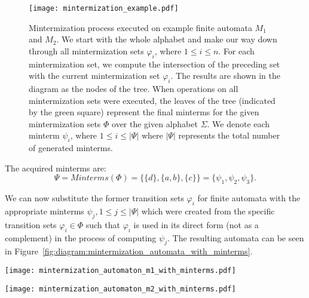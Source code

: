 \begin{figure}[ht]
	\centering
	\texttt{[image: mintermization\_example.pdf]}
	\caption{Mintermization process executed on example finite automata $M_1$ and $M_2$. We start with the whole alphabet and make our way down through all mintermization sets $\varphi_i$, where $1 \leq i \leq n$. For each mintermization set, we compute the intersection of the preceding set with the current mintermization set $\varphi_i$. The results are shown in the diagram as the nodes of the tree. When operations on all mintermization sets were executed, the leaves of the tree (indicated by the green square) represent the final minterms for the given mintermization sets $\Phi$ over the given alphabet $\Sigma$. We denote each minterm $\psi_i$, where $1 \leq i \leq |\Psi|$ where $|\Psi|$ represents the total number of generated minterms.}
	\label{fig:diagram:mintermization_example}
\end{figure}

The acquired minterms are:
$$ \Psi = Minterms(\Phi) = \{ \{d\}, \{a, b\}, \{c\} \} = \{ \psi_1, \psi_2, \psi_3 \} \text{.}$$

We can now substitute the former transition sets $\varphi_i$ for finite automata with the appropriate minterms $\psi_j, 1 \leq j \leq |\Psi|$ which were created from the specific transition sets $\varphi_i \in \Phi$ such that $\varphi_i$ is used in its direct form (not as a complement) in the process of computing $\psi_j$. The resulting automata can be seen in Figure~\ref{fig:diagram:mintermization_automata_with_minterms}.

\begin{figure*}[ht]
    \centering
    \begin{minipage}{0.49\linewidth}
        \centering
        \texttt{[image: mintermization\_automaton\_m1\_with\_minterms.pdf]}
        \caption{Finite automaton $M_1$ with transitions substituted by corresponding minterms $psi_i \in \Psi$ created from these transition sets.}
        \label{fig:diagram:mintermization_automaton_m1_with_minterms}
    \end{minipage}
    \hfill
    \begin{minipage}{0.49\linewidth}
        \centering
        \texttt{[image: mintermization\_automaton\_m2\_with\_minterms.pdf]}
        \caption{Finite automaton $M_2$ with transitions substituted by corresponding minterms $psi_i \in \Psi$ created from these transition sets.}
        \label{fig:diagram:mintermization_automaton_m2_with_minterms}
    \end{minipage}
    \vspace{0.5cm}
    \caption{Finite automata $M_1$ and $M_2$ with substituted transitions with minterms in the process of mintermization.}
    \label{fig:diagram:mintermization_automata_with_minterms}
\end{figure*}

